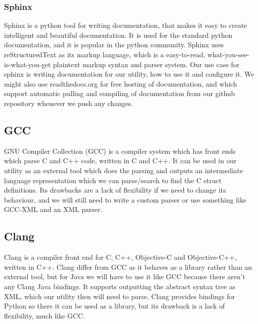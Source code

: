 \subsubsection{Sphinx}
Sphinx is a python tool for writing documentation, that makes it easy to create
intelligent and beautiful documentation. It is used for the standard python
documentation, and it is  popular in the python community. Sphinx uses
reStructuredText as its markup language, which is a easy-to-read,
what-you-see-is-what-you-get plaintext markup syntax and parser system. Our use
case for sphinx is writing documentation for our utility, how to use it and
configure it. We might also use readthedocs.org for free hosting of
documentation, and which support automatic pulling and compiling of
documentation from our github repository whenever we push any changes.

\subsection{GCC}
GNU Compiler Collection (GCC) is a compiler system which has front ends which
parse C and C++ code, written in C and C++. It can be used in our utility as
an external tool which does the parsing and outputs an intermediate language
representation which we can parse/search to find the C struct definitions. Its
drawbacks are a lack of flexibility if we need to change its behaviour, and we
will still need to write a custom parser or use something like GCC-XML and an
XML parser. 

\subsection{Clang}
Clang is a compiler front end for C, C++, Objective-C and Objective-C++,
written in C++. Clang differ from GCC as it behaves as a library rather than an
external tool, but for Java we will have to use it like GCC because there
aren’t any Clang Java bindings. It supports outputting the abstract syntax
tree as XML, which our utility then will need to parse. Clang provides bindings
for Python so there it can be used as a library, but its drawback is a lack of
flexibility, much like GCC.

